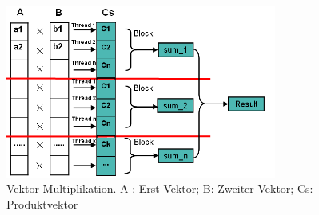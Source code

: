 


\begin{figure}[htbp]
\includegraphics[width=3.5in]{.//pic//Vektor}
\caption{Vektor Multiplikation. A : Erst Vektor; B: Zweiter Vektor; Cs: Produktvektor}
\label{Vektor} 
\end{figure}